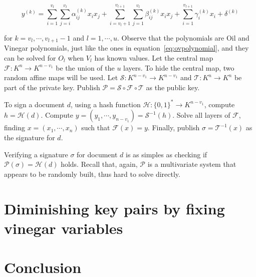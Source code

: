 \documentclass{ufsctex/ufsctex}
\begin{document}
\begin{equation}
y^{(k)} =
\sum_{i=1}^{v_l}\sum_{j=i}^{v_l} \alpha^{(k)}_{ij} x_i x_j +
\sum_{i=v_l+1}^{v_{l+1}}\sum_{j=1}^{v_l} \beta^{(k)}_{ij} x_i x_j +
\sum_{i=1}^{v_{l+1}} \gamma^{(k)}_{i} x_i + 
\delta^{(k)}
\end{equation}

for $k = v_l, \cdots, v_{l+1} - 1$ and $l = 1, \cdots, u$. Observe that the
polynomials are Oil and Vinegar polynomials, just like the ones in
equation~\ref{eq:ovpolynomial}, and they can be solved for $O_l$ when $V_l$ has
known values. Let the central map $\mathcal{F}:K^{n} \to K^{n-v_1}$ be the
union of the $u$ layers. To hide the central map, two random affine maps will
be used. Let $\mathcal{S}:K^{n-v_1} \to K^{n-v_1}$ and $\mathcal{T}:K^{n} \to
K^{n}$ be part of the private key. Publish $\mathcal{P} = \mathcal{S} \circ
\mathcal{F} \circ \mathcal{T}$ as the public key.

To sign a document $d$, using a hash function $\mathcal{H}: \{0,1\}^* \to
K^{n-v_1}$, compute $h = \mathcal{H}(d)$. Compute $y = (y_1, \cdots, y_{n-v_1})
= \mathcal{S}^{-1}(h)$. Solve all layers of $\mathcal{F}$, finding $x = (x_1,
\cdots, x_n)$ such that $\mathcal{F}(x) = y$. Finally, publish $\sigma =
\mathcal{T}^{-1}(x)$ as the signature for $d$.

Verifying a signature $\sigma$ for document $d$ is as simples as checking if
$\mathcal{P}(\sigma) = \mathcal{H}(d)$ holds. Recall that, again, $\mathcal{P}$
is a multivariate system that appears to be randomly built, thus hard to solve
directly.




\chapter{Diminishing key pairs by fixing vinegar variables}

\chapter{Conclusion}



\end{document}

